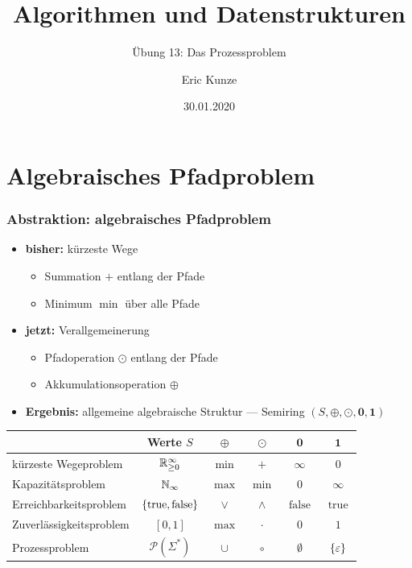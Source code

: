 \documentclass{beamer}
\DeclareMathOperator{\true}{true}
\DeclareMathOperator{\false}{false}
\begin{document}
	
	\title{Algorithmen und Datenstrukturen}
	\subtitle{Übung 13: Das Prozessproblem}
	\author{Eric Kunze}
	\date{30.01.2020}

	\maketitle


\section{Algebraisches Pfadproblem}

\begin{frame} \frametitle{Abstraktion: algebraisches Pfadproblem}
	\small
	\begin{itemize}
		\item \textbf{bisher:} kürzeste Wege
		\begin{itemize}
			\item Summation $+$ entlang der Pfade
			\item Minimum $\min$ über alle Pfade
		\end{itemize}
		\item \textbf{jetzt:} Verallgemeinerung
		\begin{itemize}
			\item Pfadoperation $\odot$ entlang der Pfade
			\item Akkumulationsoperation $\oplus$
		\end{itemize}
		\item \textbf{Ergebnis:} allgemeine algebraische Struktur --- Semiring $(S, \oplus, \odot, \mathbf{0}, \mathbf{1})$
	\end{itemize}

	\centering
	
	\begin{tabular}{lccccc}
		\hline
		& Werte $S$ & $\oplus$ & $\odot$ & $\mathbf{0}$ & $\mathbf{1}$ \\
		\hline
		kürzeste Wegeproblem & $\mathbb{R}_{\ge 0}^\infty$ & $\min$ & $+$ & $\infty$ & $0$ \\
		Kapazitätsproblem & $\mathbb{N}_\infty$ & $\max$ & $\min$ & $0$ & $\infty$ \\
		Erreichbarkeitsproblem & $\menge{\true, \false}$ & $\lor$ & $\land$ & $\false$ & $\true$ \\
		Zuverlässigkeitsproblem & $[0,1]$ & $\max$ & $\cdot$ & $0$ & $1$ \\
		Prozessproblem & $\mathcal{P}(\Sigma^\ast)$ & $\cup$ & $\circ$ & $\emptyset$ & $\left\{ \varepsilon \right\}$ \\ \hline
	\end{tabular}
\end{frame}
\end{document}
